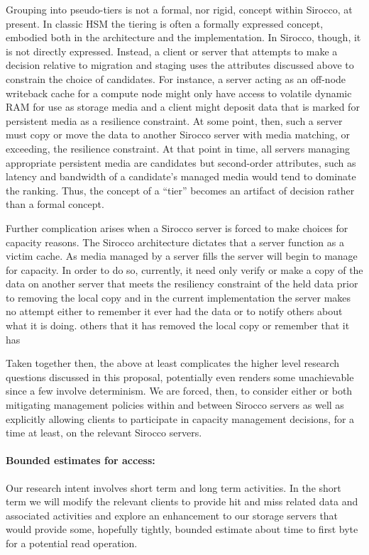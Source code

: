 Grouping into pseudo-tiers is not a formal, nor rigid, concept within Sirocco,
at present. In classic HSM the tiering is often a formally expressed concept,
embodied both in the architecture and the implementation. In Sirocco, though,
it is not directly expressed. Instead, a client or server that attempts to make
a decision relative to migration and staging uses the attributes discussed
above to constrain the choice of candidates. For instance, a server acting as
an off-node writeback cache for a compute node might only have access to
volatile dynamic RAM for use as storage media and a client might deposit data
that is marked for persistent media as a resilience constraint. At some point,
then, such a server must copy or move the data to another Sirocco server with
media matching, or exceeding, the resilience constraint. At that point in time,
all servers managing appropriate persistent media are candidates but
second-order attributes, such as latency and bandwidth of a candidate's managed
media would tend to dominate the ranking. Thus, the concept of a ``tier''
becomes an artifact of decision rather than a formal concept.

Further complication arises when a Sirocco server is forced to make choices for
capacity reasons. The Sirocco architecture dictates that a server function as a
victim cache. As media managed by a server fills the server will begin to
manage for capacity. In order to do so, currently, it need only verify or make
a copy of the data on another server that meets the resiliency constraint of
the held data prior to removing the local copy and in the current
implementation the server makes no attempt either to remember it ever had the
data or to notify others about what it is doing.  others that it has removed
the local copy or remember that it has 

Taken together then, the above at least complicates the higher level research
questions discussed in this proposal, potentially even renders some
unachievable since a few involve determinism. We are forced, then, to consider
either or both mitigating management policies within and between Sirocco
servers as well as explicitly allowing clients to participate in capacity
management decisions, for a time at least, on the relevant Sirocco servers.

\paragraph{Bounded estimates for access:}
Our research intent involves short term and long term activities. In the short
term we will modify the relevant clients to provide hit and miss related data
and associated activities and explore an enhancement to our storage servers
that would provide some, hopefully tightly, bounded estimate about time to
first byte for a potential read operation. 

